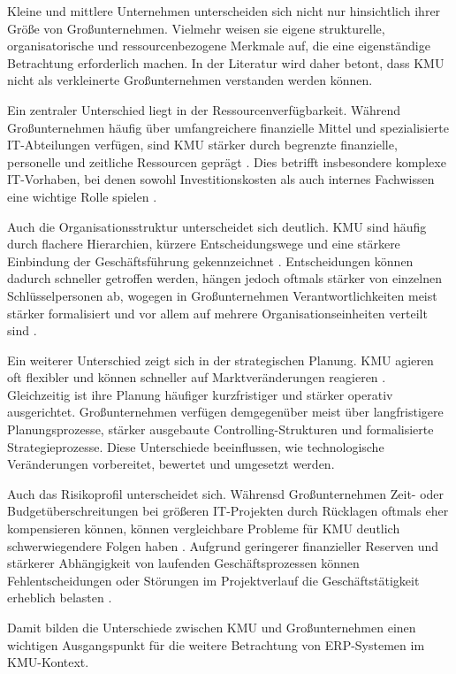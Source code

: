 
Kleine und mittlere Unternehmen unterscheiden sich nicht nur hinsichtlich ihrer
Größe von Großunternehmen. Vielmehr weisen sie eigene strukturelle,
organisatorische und ressourcenbezogene Merkmale auf, die eine eigenständige
Betrachtung erforderlich machen. In der Literatur wird daher betont, dass KMU
nicht als verkleinerte Großunternehmen verstanden werden können.
\parencite{Leyh2015}

Ein zentraler Unterschied liegt in der Ressourcenverfügbarkeit. 
Während Großunternehmen häufig über umfangreichere finanzielle Mittel und spezialisierte
IT-Abteilungen verfügen, sind KMU stärker durch
begrenzte finanzielle, personelle und zeitliche Ressourcen geprägt
\parencite{Alaskari2021}. Dies betrifft insbesondere komplexe
IT-Vorhaben, bei denen sowohl Investitionskosten als auch internes Fachwissen
eine wichtige Rolle spielen \parencite{Yusuf2024, Alaskari2021}. 

Auch die Organisationsstruktur unterscheidet sich deutlich. KMU sind häufig
durch flachere Hierarchien, kürzere Entscheidungswege und eine stärkere
Einbindung der Geschäftsführung gekennzeichnet \parencite{Leyh2015}. Entscheidungen können dadurch
schneller getroffen werden, hängen jedoch oftmals stärker von einzelnen
Schlüsselpersonen ab, wogegen in Großunternehmen Verantwortlichkeiten
meist stärker formalisiert und vor allem auf mehrere Organisationseinheiten verteilt sind \parencite{Xia2009,Leyh2015}. 

Ein weiterer Unterschied zeigt sich in der strategischen Planung. 
KMU agieren oft flexibler und können schneller auf Marktveränderungen reagieren \parencite{Nach2008}. 
Gleichzeitig ist ihre Planung häufiger kurzfristiger und stärker operativ ausgerichtet.
Großunternehmen verfügen demgegenüber meist über langfristigere
Planungsprozesse, stärker ausgebaute Controlling-Strukturen und formalisierte
Strategieprozesse. Diese Unterschiede beeinflussen, wie technologische
Veränderungen vorbereitet, bewertet und umgesetzt werden.
\parencite{Leyh2017, Nach2008}

Auch das Risikoprofil unterscheidet sich. Währensd Großunternehmen Zeit- oder
Budgetüberschreitungen bei größeren IT-Projekten durch Rücklagen oftmals eher kompensieren
können, können vergleichbare Probleme für KMU deutlich schwerwiegendere Folgen
haben \parencite{Nach2008,Alaskari2021,Leyh2015}. Aufgrund geringerer finanzieller Reserven und stärkerer Abhängigkeit von
laufenden Geschäftsprozessen können Fehlentscheidungen oder Störungen im
Projektverlauf die Geschäftstätigkeit erheblich belasten \parencite{Alaskari2021,Leyh2015}.

Damit bilden die Unterschiede zwischen KMU und Großunternehmen einen wichtigen
Ausgangspunkt für die weitere Betrachtung von ERP-Systemen im KMU-Kontext. 

